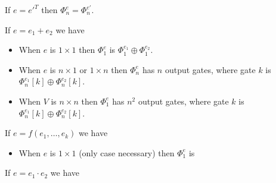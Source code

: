 If $e=e'^T$ then $\Phi^e_n=\Phi^{e'}_n$. 

If $e=e_1 + e_2$ we have

\begin{itemize}
	\item When $e$ is $1\times 1$ then $\Phi^e_1$ is $\Phi^{e_1}_1 \oplus \Phi^{e_2}_1$.
	\item When $e$ is $n\times 1$ or $1\times n$ then $\Phi^e_n$ has $n$ output gates, where gate $k$ is $\Phi^{e_1}_n[k] \oplus \Phi^{e_2}_n[k]$.
	\item When $V$ is $n\times n$ then $\Phi^e_1$ has $n^2$ output gates, where gate $k$ is $\Phi^{e_1}_n[k] \oplus \Phi^{e_2}_n[k]$.
\end{itemize}

If $e=f(e_1, \ldots, e_k)$ we have

\begin{itemize}
	\item When $e$ is $1\times 1$ (only case necessary) then $\Phi^e_1$ is 
	
\begin{center}
\end{center}

\end{itemize}

If $e=e_1\cdot e_2$ we have

